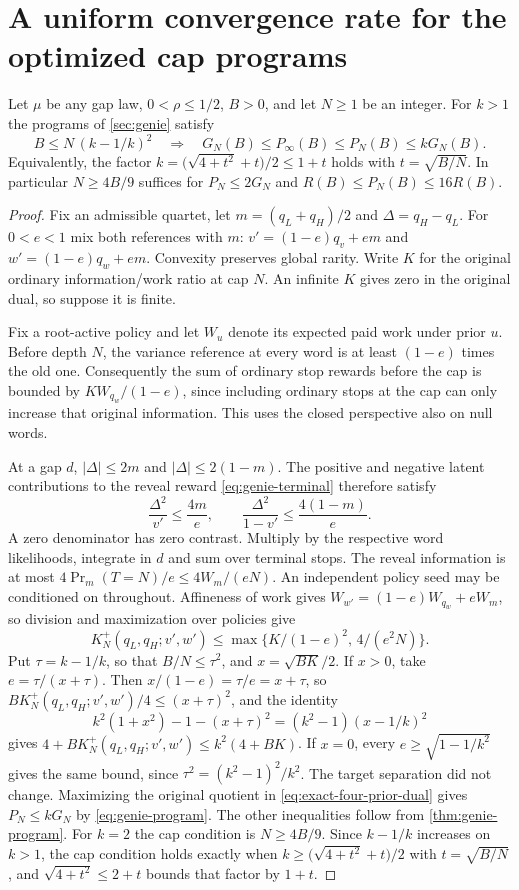 \section{A uniform convergence rate for the optimized cap programs}
\label{app:uniform-cap-rate}

\begin{theorem}\label{thm:uniform-cap-rate}
Let $\mu$ be any gap law, $0<\rho\le1/2$, $B>0$, and let $N\ge1$ be an
integer. For $k>1$ the programs of \cref{sec:genie} satisfy
\[
 B\le N\,(k-1/k)^2
 \quad\Longrightarrow\quad
 G_N(B)\le P_\infty(B)\le P_N(B)\le kG_N(B).
\]
Equivalently, the factor $k=\bigl(\sqrt{4+t^2}+t\bigr)/2\le1+t$ holds with
$t=\sqrt{B/N}$. In particular $N\ge4B/9$ suffices for $P_N\le2G_N$ and
$R(B)\le P_N(B)\le16R(B)$.
\end{theorem}

\begin{proof}
Fix an admissible quartet, let $m=(q_L+q_H)/2$ and
$\Delta=q_H-q_L$. For $0<e<1$ mix both references with $m$:
$v'=(1-e)q_v+em$ and $w'=(1-e)q_w+em$. Convexity preserves global
rarity. Write $K$ for the original ordinary information/work ratio at cap
$N$. An infinite $K$ gives zero in the original dual, so suppose it is
finite.

Fix a root-active policy and let $W_u$ denote its expected paid work
under prior $u$. Before depth $N$, the variance reference at every word
is at least $(1-e)$ times the old one. Consequently the sum of ordinary
stop rewards before the cap is bounded by $K W_{q_w}/(1-e)$, since
including ordinary stops at the cap can only increase that original
information. This uses the closed perspective also on null words.

At a gap $d$, $|\Delta|\le2m$ and $|\Delta|\le2(1-m)$. The positive and
negative latent contributions to the reveal reward
\eqref{eq:genie-terminal} therefore satisfy
\[
 \frac{\Delta^2}{v'}\le\frac{4m}{e},\qquad
 \frac{\Delta^2}{1-v'}\le\frac{4(1-m)}{e}.
\]
A zero denominator has zero contrast. Multiply by the respective word
likelihoods, integrate in $d$ and sum over terminal stops. The reveal
information is at most $4\Pr_m(T=N)/e\le 4W_m/(eN)$.
An independent policy seed may be conditioned on throughout.
Affineness of work gives $W_{w'}=(1-e)W_{q_w}+eW_m$, so division and
maximization over policies give
\[
 K_N^+(q_L,q_H;v',w')
 \le \max\{K/(1-e)^2,\,4/(e^2 N)\}.
\]
Put $\tau=k-1/k$, so that $B/N\le\tau^2$, and $x=\sqrt{BK}/2$. If $x>0$,
take $e=\tau/(x+\tau)$. Then $x/(1-e)=\tau/e=x+\tau$, so
$BK_N^+(q_L,q_H;v',w')/4\le(x+\tau)^2$, and the identity
\[
 k^2(1+x^2)-1-(x+\tau)^2=(k^2-1)(x-1/k)^2
\]
gives $4+BK_N^+(q_L,q_H;v',w')\le k^2(4+BK)$. If $x=0$, every
$e\ge\sqrt{1-1/k^2}$ gives the same bound, since $\tau^2=(k^2-1)^2/k^2$.
The target separation did not change. Maximizing the original quotient
in \eqref{eq:exact-four-prior-dual} gives $P_N\le kG_N$ by
\eqref{eq:genie-program}. The other inequalities follow from
\cref{thm:genie-program}. For $k=2$ the cap condition is $N\ge4B/9$.
Since $k-1/k$ increases on $k>1$, the cap condition holds exactly when
$k\ge\bigl(\sqrt{4+t^2}+t\bigr)/2$ with $t=\sqrt{B/N}$, and
$\sqrt{4+t^2}\le2+t$ bounds that factor by $1+t$.
\end{proof}


